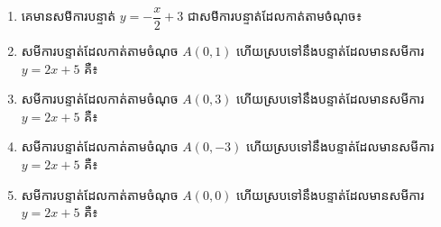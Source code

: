 \begin{enumerate}
\item គេមានសមីការបន្ទាត់ $y=-\dfrac{x}{2}+3$ ជាសមីការបន្ទាត់ដែលកាត់តាមចំណុច៖
\begin{enumerate}[label=\alph*.]
\end{enumerate}

\item សមីការបន្ទាត់ដែលកាត់តាមចំណុច $A(0,1)$ ហើយស្របទៅនឹងបន្ទាត់ដែលមានសមីការ $y=2x+5$ គឺ៖
\begin{enumerate}[label=\alph*.]
\end{enumerate}

\item សមីការបន្ទាត់ដែលកាត់តាមចំណុច $A(0,3)$ ហើយស្របទៅនឹងបន្ទាត់ដែលមានសមីការ $y=2x+5$ គឺ៖
\begin{enumerate}[label=\alph*.]
\end{enumerate}

\item សមីការបន្ទាត់ដែលកាត់តាមចំណុច $A(0,-3)$ ហើយស្របទៅនឹងបន្ទាត់ដែលមានសមីការ $y=2x+5$ គឺ៖
\begin{enumerate}[label=\alph*.]
\end{enumerate}

\item សមីការបន្ទាត់ដែលកាត់តាមចំណុច $A(0,0)$ ហើយស្របទៅនឹងបន្ទាត់ដែលមានសមីការ $y=2x+5$ គឺ៖
\begin{enumerate}[label=\alph*.]
\end{enumerate}


\end{enumerate}
